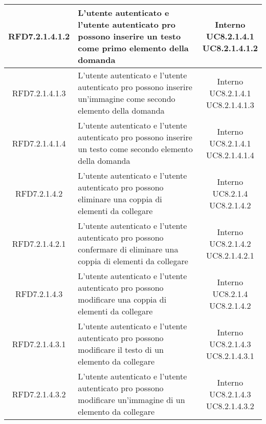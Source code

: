 \begin{longtable}{|c|>{\centering}m{7cm}|c|}
			 \hypertarget{{RFD7.2.1.4.1.2}}{{RFD7.2.1.4.1.2}} & L’utente autenticato e l'utente autenticato pro possono inserire un testo come primo elemento della domanda & \makecell{Interno\\ UC8.2.1.4.1 \\UC8.2.1.4.1.2 } \\ \hline
			 \hypertarget{{RFD7.2.1.4.1.3}}{{RFD7.2.1.4.1.3}} & L’utente autenticato e l'utente autenticato pro possono inserire un’immagine come secondo elemento della domanda  & \makecell{Interno\\ UC8.2.1.4.1 \\UC8.2.1.4.1.3 } \\ \hline
			 \hypertarget{{RFD7.2.1.4.1.4}}{{RFD7.2.1.4.1.4}} & L’utente autenticato e l'utente autenticato pro possono inserire un testo come secondo elemento della domanda  & \makecell{Interno\\ UC8.2.1.4.1 \\UC8.2.1.4.1.4 } \\ \hline
			 \hypertarget{{RFD7.2.1.4.2}}{{RFD7.2.1.4.2}} & L’utente autenticato e l'utente autenticato pro possono eliminare una coppia di elementi da collegare & \makecell{Interno\\ UC8.2.1.4 \\UC8.2.1.4.2 } \\ \hline
			 \hypertarget{{RFD7.2.1.4.2.1}}{{RFD7.2.1.4.2.1}} & L’utente autenticato e l'utente autenticato pro possono confermare di eliminare una coppia di elementi da collegare & \makecell{Interno\\ UC8.2.1.4.2 \\UC8.2.1.4.2.1 } \\ \hline
			 \hypertarget{{RFD7.2.1.4.3}}{{RFD7.2.1.4.3}} & L’utente autenticato e l'utente autenticato pro possono modificare una coppia di elementi da collegare 
 & \makecell{Interno\\ UC8.2.1.4 \\UC8.2.1.4.2 } \\ \hline
			 \hypertarget{{RFD7.2.1.4.3.1}}{{RFD7.2.1.4.3.1}} & L’utente autenticato e l'utente autenticato pro possono modificare il testo di un elemento da collegare & \makecell{Interno\\ UC8.2.1.4.3 \\UC8.2.1.4.3.1 } \\ \hline
			 \hypertarget{{RFD7.2.1.4.3.2}}{{RFD7.2.1.4.3.2}} & L’utente autenticato e l'utente autenticato pro possono modificare un’immagine di un elemento da collegare & \makecell{Interno\\ UC8.2.1.4.3 \\UC8.2.1.4.3.2 } \\ \hline

\end{longtable}
